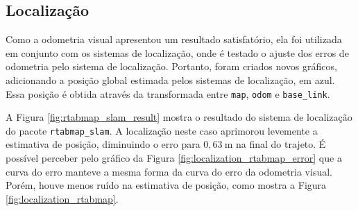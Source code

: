 \documentclass[repeatfields,xlists,xpacks,oneside,yearsonly]{ufrgscca}
\begin{document}
\subsection{Localização}

Como a odometria visual apresentou um resultado satisfatório, ela foi
utilizada em conjunto com os sistemas de localização, onde é testado
o ajuste dos erros de odometria pelo sistema de localização.
Portanto, foram criados novos gráficos, adicionando a posição global
estimada pelos sistemas de localização, em azul. Essa posição é
obtida através da transformada entre \texttt{map}, \texttt{odom} e
\texttt{base\_link}.

A Figura \ref{fig:rtabmap_slam_result} mostra o resultado do sistema
de localização do pacote \texttt{rtabmap\_slam}. A localização neste
caso aprimorou levemente a estimativa de posição, diminuindo o erro
para $0,63~\si{\meter}$ na final do trajeto. É possível perceber pelo
gráfico da Figura \ref{fig:localization_rtabmap_error} que a curva do
erro manteve a mesma forma da curva do erro da odometria visual.
Porém, houve menos ruído na estimativa de posição, como mostra a
Figura \ref{fig:localization_rtabmap}.
\end{document}
